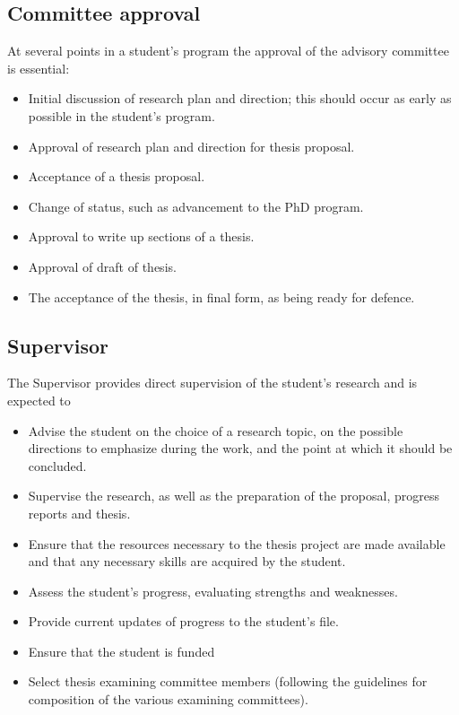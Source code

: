 \documentclass{article}
\begin{document}
\subsection{Committee approval}


At several points in a student's program the approval of the advisory committee is essential:
\begin{itemize}
\item Initial discussion of research plan and direction; this should occur as early as possible in the student's program.
\item Approval of research plan and direction for thesis proposal.
\item Acceptance of a thesis proposal.
\item Change of status, such as advancement to the PhD program.
\item Approval to write up sections of a thesis.
\item Approval of draft of thesis.
\item The acceptance of the thesis, in final form, as being ready for defence.
\end{itemize}


\subsection{Supervisor}

The Supervisor provides direct supervision of the student's research and is expected to
\begin{itemize}
\item Advise the student on the choice of a research topic, on the possible directions to emphasize during the work, and the point at which it should be concluded.
\item Supervise the research, as well as the preparation of the proposal, progress reports and thesis.
\item Ensure that the resources necessary to the thesis project are made available and that any necessary skills are acquired by the student.
\item Assess the student's progress, evaluating strengths and weaknesses.
\item Provide current updates of progress to the student's file.
\item Ensure that the student is funded
\item Select thesis examining committee members (following the guidelines for composition of the various examining committees).
\end{itemize}
\end{document}
